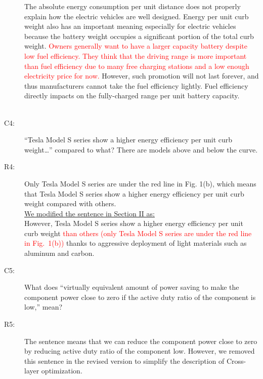 \documentclass[onecolumn]{IEEEconf}
\begin{document}
\begin{description}
The absolute energy consumption per unit distance does not properly explain how the electric vehicles are well designed. 
Energy per unit curb weight also has an important meaning especially for electric vehicles because the battery weight occupies a significant portion of the total curb weight. 
\textcolor{red}{Owners generally want to have a larger capacity battery despite low fuel efficiency. They think that the driving range is more important than fuel efficiency due to many free charging stations and a low enough electricity price for now.}
However, such promotion will not last forever, and thus manufacturers cannot take the fuel efficiency lightly. Fuel efficiency directly impacts on the fully-charged range per unit battery capacity. \\
~\\

\item [C4: ]  “Tesla Model S series show a higher energy efficiency per unit curb weight…” compared to what? There are models above and below the curve.
\item [R4: ] Only Tesla Model S series are under the red line in Fig. 1(b), which means that Tesla Model S series show a higher energy efficiency per unit curb weight compared with others. \\

\underline{We modified the sentence in Section II as:}\\
However, Tesla Model S series show a higher energy efficiency per unit curb weight \textcolor{red}{than others (only Tesla Model S series are under the red line in Fig.~1(b))} thanks to aggressive deployment of light materials such as aluminum and carbon.
~\\

\item [C5: ] What does “virtually equivalent amount of power saving to make the component power close to zero if the active duty ratio of the component is low,” mean?
\item [R5: ] The sentence means that we can reduce the component power close to zero by reducing active duty ratio of the component low. However, we removed this sentence in the revised version to simplify the description of Cross-layer optimization.\\
~\\

\end{description}
\end{document}
